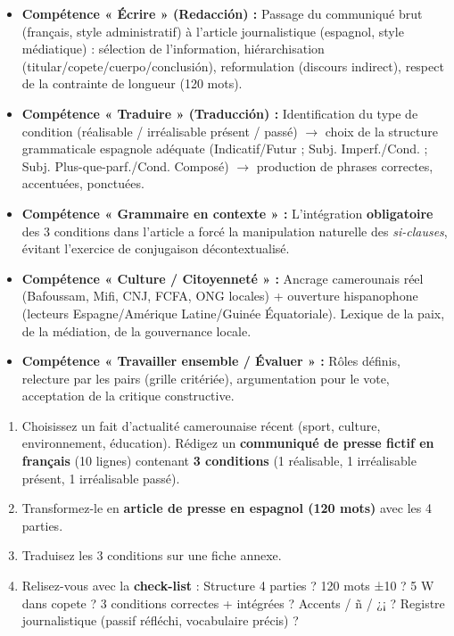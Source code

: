 \documentclass[11pt]{article}
\newcommand{\cle}[1]{{\popxbold\color{popdark}#1}}
\newcounter{popsec}
\newcounter{popsub}
\newcommand{\courssub}[1]{%
  \stepcounter{popsub}%
  \par\vspace{9pt}\noindent{\popxbold\fontsize{11.5}{13}\selectfont\color{popink}{\color{poporange}\thepopsec.\thepopsub}\hspace{6pt}#1}\par\nopagebreak\vspace{4pt}
}
\begin{document}
\courssub{Bilan de l'activité}
\begin{aretenir}
\begin{itemize}
    \item \textbf{Compétence « Écrire » (Redacción) :} Passage du communiqué brut (français, style administratif) à l'article journalistique (espagnol, style médiatique) : sélection de l'information, hiérarchisation (titular/copete/cuerpo/conclusión), reformulation (discours indirect), respect de la contrainte de longueur (120 mots).
    \item \textbf{Compétence « Traduire » (Traducción) :} Identification du type de condition (réalisable / irréalisable présent / passé) $\rightarrow$ choix de la structure grammaticale espagnole adéquate (Indicatif/Futur ; Subj. Imperf./Cond. ; Subj. Plus-que-parf./Cond. Composé) $\rightarrow$ production de phrases correctes, accentuées, ponctuées.
    \item \textbf{Compétence « Grammaire en contexte » :} L'intégration \textbf{obligatoire} des 3 conditions dans l'article a forcé la manipulation naturelle des \emph{si-clauses}, évitant l'exercice de conjugaison décontextualisé.
    \item \textbf{Compétence « Culture / Citoyenneté » :} Ancrage camerounais réel (Bafoussam, Mifi, CNJ, FCFA, ONG locales) + ouverture hispanophone (lecteurs Espagne/Amérique Latine/Guinée Équatoriale). Lexique de la paix, de la médiation, de la gouvernance locale.
    \item \textbf{Compétence « Travailler ensemble / Évaluer » :} Rôles définis, relecture par les pairs (grille critériée), argumentation pour le vote, acceptation de la critique constructive.
\end{itemize}
\end{aretenir}

\begin{methode}
\begin{enumerate}
    \item Choisissez un fait d'actualité camerounaise récent (sport, culture, environnement, éducation). Rédigez un \textbf{communiqué de presse fictif en français} (10 lignes) contenant \textbf{3 conditions} (1 réalisable, 1 irréalisable présent, 1 irréalisable passé).
    \item Transformez-le en \textbf{article de presse en espagnol (120 mots)} avec les 4 parties.
    \item Traduisez les 3 conditions sur une fiche annexe.
    \item Relisez-vous avec la \textbf{check-list} : \cle{Structure 4 parties} ? \cle{120 mots ±10} ? \cle{5 W dans copete} ? \cle{3 conditions correctes + intégrées} ? \cle{Accents / ñ / ¿¡} ? \cle{Registre journalistique (passif réfléchi, vocabulaire précis)} ?
\end{enumerate}
\end{methode}
\end{document}
